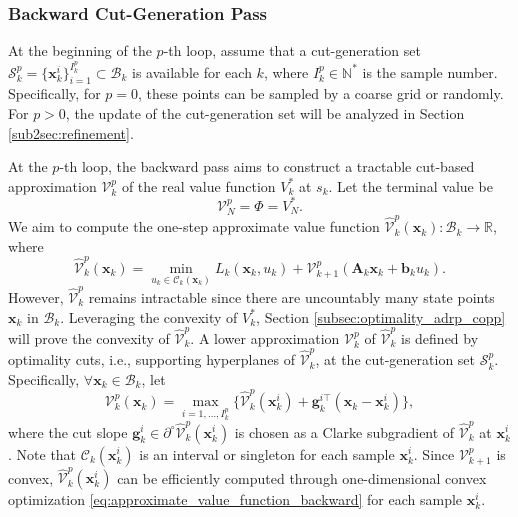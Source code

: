 \documentclass[journal]{IEEEtran}
\theoremstyle{definition}
\theoremstyle{definition}
\newcommand\R{{\mathbb{R}}}
\newcommand\N{{\mathbb{N}}}
\renewcommand\vector[1]{\boldsymbol{#1}}
\newcommand\vb{{\vector{b}}}
\newcommand\vg{{\vector{g}}}
\newcommand\vx{{\vector{x}}}
\newcommand\vA{{\vector{A}}}
\begin{document}
\subsubsection{Backward Cut-Generation Pass}\label{sub2sec:backward_cut_pass}

At the beginning of the $p$-th loop, assume that a cut-generation set $\mathcal{S}_k^p=\{\vx_k^{i}\}_{i=1}^{I_k^p}\subset\mathcal{B}_k$ is available for each $k$, where $I_k^p\in\N^*$ is the sample number. Specifically, for $p=0$, these points can be sampled by a coarse grid or randomly. For $p>0$, the update of the cut-generation set will be analyzed in Section \ref{sub2sec:refinement}.

At the $p$-th loop, the backward pass aims to construct a tractable cut-based approximation $\mathcal{V}_k^p$ of the real value function $V_k^*$ at $s_k$. Let the terminal value be
\begin{equation}\label{eq:approximation_terminal_value}
    \mathcal{V}_N^p=\Phi=V_N^*.
\end{equation}
We aim to compute the one-step approximate value function $\widehat{\mathcal{V}}_k^p(\vx_k):\mathcal{B}_k\to\R$, where
\begin{equation}\label{eq:approximate_value_function_backward}
    \widehat{\mathcal{V}}_k^p(\vx_k) = \min_{u_k\in\mathcal{C}_k(\vx_k)} L_k(\vx_k, u_k) + \mathcal{V}_{k+1}^p(\vA_k\vx_k+\vb_k u_k).
\end{equation}
However, $\widehat{\mathcal{V}}_k^p$ remains intractable since there are uncountably many state points $\vx_k$ in $\mathcal{B}_k$. Leveraging the convexity of $V_k^*$, Section \ref{subsec:optimality_adrp_copp} will prove the convexity of $\widehat{\mathcal{V}}_k^p$. A lower approximation $\mathcal{V}_k^p$ of $\widehat{\mathcal{V}}_k^p$ is defined by optimality cuts, i.e., supporting hyperplanes of $\widehat{\mathcal{V}}_k^p$, at the cut-generation set $\mathcal{S}_k^p$. Specifically, $\forall \vx_k\in\mathcal{B}_k$, let
\begin{equation}\label{eq:support_plane}
    \mathcal{V}_k^p(\vx_k) = \max_{i=1,\ldots,I_k^p} \Big\{\widehat{\mathcal{V}}_k^p(\vx_k^i) + \vg_k^{i\top}(\vx_k-\vx_k^i)\Big\},
\end{equation}
where the cut slope $\vg_k^i\in\partial^\circ\widehat{\mathcal{V}}_k^p(\vx_k^i)$ is chosen as a Clarke subgradient \cite{clarke1990optimization} of $\widehat{\mathcal{V}}_k^p$ at $\vx_k^i$. Note that $\mathcal{C}_k(\vx_k^i)$ is an interval or singleton for each sample $\vx_k^i$. Since $\mathcal{V}_{k+1}^p$ is convex, $\widehat{\mathcal{V}}_k^p(\vx_k^i)$ can be efficiently computed through one-dimensional convex optimization \eqref{eq:approximate_value_function_backward} for each sample $\vx_k^i$.
\end{document}
